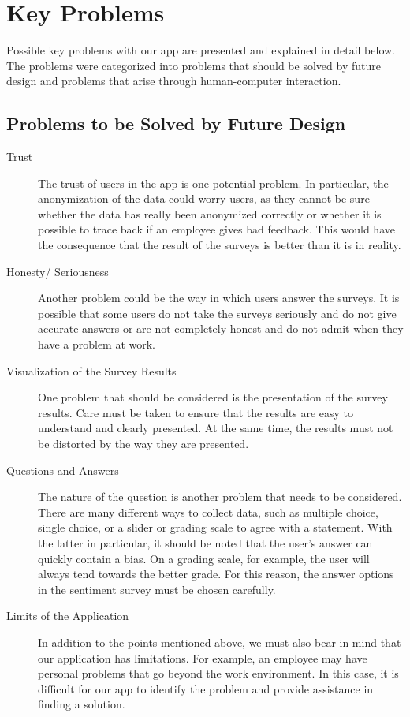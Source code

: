 \documentclass[11pt]{article}
\begin{document}
\section{Key Problems}
Possible key problems with our app are presented and explained in detail below. The problems were categorized into problems that should be solved by future design and problems that arise through human-computer interaction.

\subsection{Problems to be Solved by Future Design}

\begin{description}
    \item[Trust] The trust of users in the app is one potential problem. In particular, the anonymization of the data could worry users, as they cannot be sure whether the data has really been anonymized correctly or whether it is possible to trace back if an employee gives bad feedback. This would have the consequence that the result of the surveys is better than it is in reality.
    \item[Honesty/ Seriousness] Another problem could be the way in which users answer the surveys. It is possible that some users do not take the surveys seriously and do not give accurate answers or are not completely honest and do not admit when they have a problem at work.
    \item[Visualization of the Survey Results] One problem that should be considered is the presentation of the survey results. Care must be taken to ensure that the results are easy to understand and clearly presented. At the same time, the results must not be distorted by the way they are presented. 
    \item[Questions and Answers] The nature of the question is another problem that needs to be considered. There are many different ways to collect data, such as multiple choice, single choice, or a slider or grading scale to agree with a statement. With the latter in particular, it should be noted that the user's answer can quickly contain a bias. On a grading scale, for example, the user will always tend towards the better grade. For this reason, the answer options in the sentiment survey must be chosen carefully. 
    \item[Limits of the Application] In addition to the points mentioned above, we must also bear in mind that our application has limitations. For example, an employee may have personal problems that go beyond the work environment. In this case, it is difficult for our app to identify the problem and provide assistance in finding a solution.
    \end{description}
\end{document}
